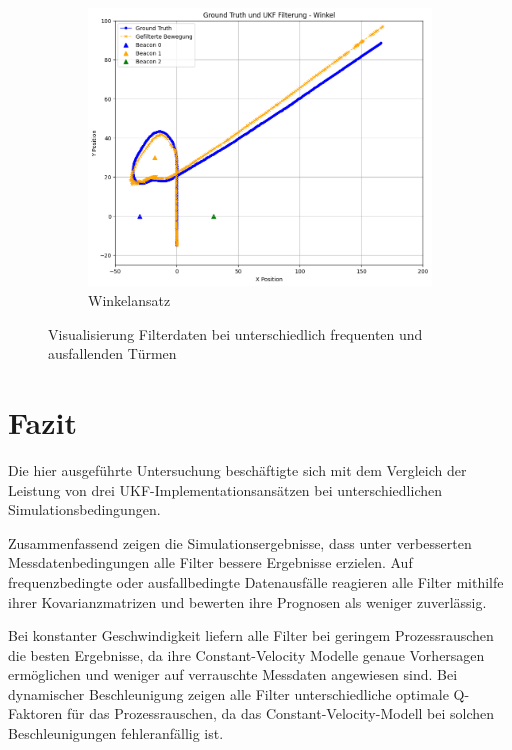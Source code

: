 \documentclass[conference]{IEEEtran}[10pt]
\begin{document}
\begin{figure}
\begin{subfigure}{.333\textwidth}
        \includegraphics[width=.9\linewidth]{Ergebnisse/plots_fahrten/winkel/winkel_dyn_acc_flag_freq.png}
        \caption{Winkelansatz}
    \end{subfigure}
    \caption{Visualisierung Filterdaten bei unterschiedlich frequenten und ausfallenden Türmen}
    \label{fig:fahrtvisualisierung}
\end{figure}




\section{Fazit}

Die hier ausgeführte Untersuchung beschäftigte sich mit dem Vergleich der Leistung von drei UKF-Implementationsansätzen bei unterschiedlichen Simulationsbedingungen. 

Zusammenfassend zeigen die Simulationsergebnisse, dass unter verbesserten Messdatenbedingungen alle Filter bessere Ergebnisse erzielen. Auf frequenzbedingte oder ausfallbedingte Datenausfälle reagieren alle Filter mithilfe ihrer Kovarianzmatrizen und bewerten ihre Prognosen als weniger zuverlässig.

Bei konstanter Geschwindigkeit liefern alle Filter bei geringem Prozessrauschen die besten Ergebnisse, da ihre Constant-Velocity Modelle genaue Vorhersagen ermöglichen und weniger auf verrauschte Messdaten angewiesen sind. Bei dynamischer Beschleunigung zeigen alle Filter unterschiedliche optimale Q-Faktoren für das Prozessrauschen, da das Constant-Velocity-Modell bei solchen Beschleunigungen fehleranfällig ist.
\end{document}

